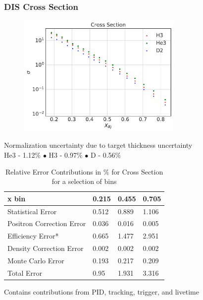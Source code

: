 \documentclass[12pt]{beamer}
\begin{document}
\begin{frame}{}
\frametitle{DIS Cross Section}
\centering
\begin{figure}
	\includegraphics[width=8cm]{../images/total_xs.pdf}
\end{figure}

Normalization uncertainty due to target thickness uncertainty\\
He3 - 1.12$\%$ $\bullet$ H3 - 0.97$\%$ $\bullet$  D - 0.56$\%$
\end{frame}
\begin{frame}{}
\begin{table}[]
		\caption*{Relative Error Contributions in $\%$ for Cross Section for a selection of bins}
	\begin{tabular}{|l|l|l|l|}
		\hline
		\textbf{\qquad \qquad\qquad x bin}   & \textbf{0.215} & \textbf{0.455} & \textbf{0.705} \\ \hline\hline
		Statistical Error            & 0.512 & 0.889 & 1.106 \\ \hline
		Positron Correction Error    & 0.036 & 0.016 & 0.005 \\ \hline
		Efficiency Error*            & 0.665 & 1.477 & 2.951 \\ \hline
		Density Correction Error     & 0.002 & 0.002 & 0.002 \\ \hline
		Monte Carlo Error            & 0.193 & 0.217 & 0.209 \\ \hline
		Total Error		 	 		 & 0.95  & 1.931 & 3.316 \\ \hline
	\end{tabular}
\end{table}
\centering	* Contains contributions from PID, tracking, trigger, and livetime

\end{frame}
\end{document}
